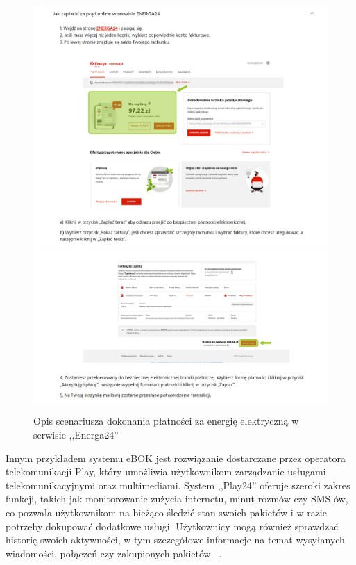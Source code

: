 \begin{figure}[htb]
	\centering
		\includegraphics[width=0.85\linewidth]{rys01/energa_manual_1.png} \\[-1ex]
		\includegraphics[width=0.85\linewidth]{rys01/energa_manual_2.png} \\[-1ex]
		\caption{Opis scenariusza dokonania płatności za energię elektryczną w serwisie ,,Energa24''~\cite{energa}}
	\label{fig:energa_manual}
\end{figure}

Innym przykładem systemu eBOK jest rozwiązanie dostarczane przez operatora telekomunikacji Play, który umożliwia użytkownikom zarządzanie usługami telekomunikacyjnymi oraz multimediami. System ,,Play24'' oferuje szeroki zakres funkcji, takich jak monitorowanie zużycia internetu, minut rozmów czy SMS-ów, co pozwala użytkownikom na bieżąco śledzić stan swoich pakietów i w razie potrzeby dokupować dodatkowe usługi. Użytkownicy mogą również sprawdzać historię swoich aktywności, w tym szczegółowe informacje na temat wysyłanych wiadomości, połączeń czy zakupionych pakietów ~\cite{Play24}.


